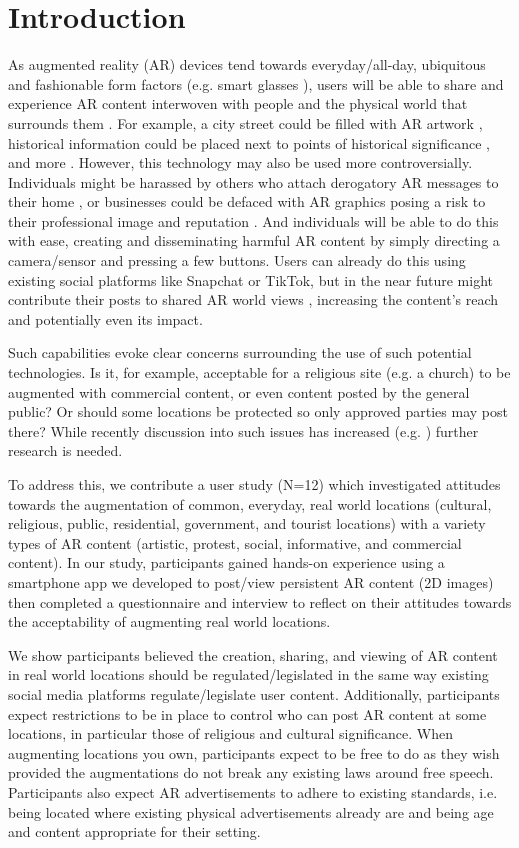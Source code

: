\section{Introduction}
As augmented reality (AR) devices tend towards everyday/all-day, ubiquitous and fashionable form factors \cite{imwut-joseph, mmve-joseph, mathis2023breaking} (e.g. smart glasses \cite{imwut-joseph}), users will be able to share and experience AR content interwoven with people \cite{jolie-vrst} and the physical world that surrounds them \cite{intro_3}.
For example, a city street could be filled with AR artwork \cite{street-art}, historical information could be placed next to points of historical significance \cite{intro_6}, and more \cite{mum-essay}. 
However, this technology may also be used more controversially. 
Individuals might be harassed by others who attach derogatory AR messages to their home \cite{intro_7}, or businesses could be defaced with AR graphics posing a risk to their professional image and reputation \cite{intro_8}. 
And individuals will be able to do this with ease, creating and disseminating harmful AR content by simply directing a camera/sensor and pressing a few buttons. 
Users can already do this using existing social platforms like Snapchat or TikTok, but in the near future might contribute their posts to shared AR world views \cite{dig-graf-1, dig-graf-2}, increasing the content's reach and potentially even its impact. 

Such capabilities evoke clear concerns surrounding the use of such potential technologies. 
Is it, for example, acceptable for a religious site (e.g. a church) to be augmented with commercial content, or even content posted by the general public? 
Or should some locations be protected so only approved parties may post there?
While recently discussion into such issues has increased (e.g. \cite{lit_1, lit_2, lit_3}) further research is needed. 

To address this, we contribute a user study (N=12) which investigated attitudes towards the augmentation of common, everyday, real world locations (cultural, religious, public, residential, government, and tourist locations) with a variety types of AR content (artistic, protest, social, informative, and commercial content). 
In our study, participants gained hands-on experience using a smartphone app we developed to post/view persistent AR content (2D images) then completed a questionnaire and interview to reflect on their attitudes towards the acceptability of augmenting real world locations. 

We show participants believed the creation, sharing, and viewing of AR content in real world locations should be regulated/legislated in the same way existing social media platforms regulate/legislate user content. 
Additionally, participants expect restrictions to be in place to control who can post AR content at some locations, in particular those of religious and cultural significance. 
When augmenting locations you own, participants expect to be free to do as they wish provided the augmentations do not break any existing laws around free speech. 
Participants also expect AR advertisements to adhere to existing standards, i.e. being located where existing physical advertisements already are and being age and content appropriate for their setting. 